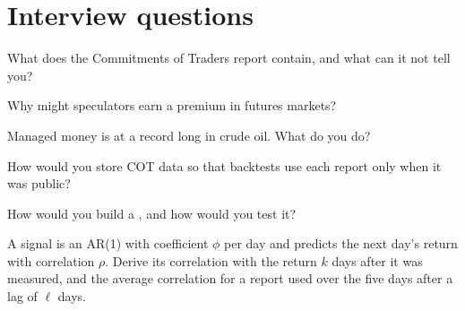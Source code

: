 \section{Interview questions}

\begin{interviewq}\label{iq:s1:positioning-and-sentiment:1}
What does the Commitments of Traders report contain, and what can it not tell you?
\end{interviewq}

\begin{interviewq}\label{iq:s1:positioning-and-sentiment:2}
Why might speculators earn a premium in futures markets?
\end{interviewq}

\begin{interviewq}\label{iq:s1:positioning-and-sentiment:3}
Managed money is at a record long in crude oil. What do you do?
\end{interviewq}

\begin{interviewq}\label{iq:s1:positioning-and-sentiment:4}
How would you store COT data so that backtests use each report only when it was public?
\end{interviewq}

\begin{interviewq}\label{iq:s1:positioning-and-sentiment:5}
How would you build a , and how would you test it?
\end{interviewq}

\begin{interviewq}\label{iq:s1:positioning-and-sentiment:6}
A signal is an AR(1) with coefficient $\phi$ per day and predicts the next day's return with correlation $\rho$. Derive its correlation with the return
$k$ days after it was measured, and the average correlation for a report used over the five days after a lag of $\ell$ days.
\end{interviewq}
